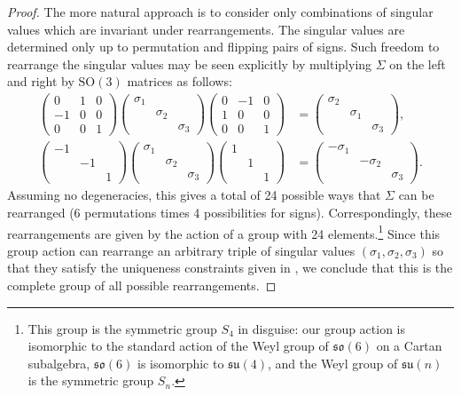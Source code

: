 \begin{proof}
The more natural approach is to consider only combinations of singular values which are invariant under rearrangements. The singular values are determined only up to permutation and flipping pairs of signs. Such freedom to rearrange the singular values may be seen explicitly by multiplying $\Sigma$ on the left and right by $\mathrm{SO}(3)$ matrices as follows:
\begin{align}
\left(\begin{array}{ccc}
0 & 1 & 0\\
-1 & 0 & 0\\
0 & 0 & 1
\end{array}\right)\left(\begin{array}{ccc}
\sigma_{1}\\
 & \sigma_{2}\\
 &  & \sigma_{3}
\end{array}\right)\left(\begin{array}{ccc}
0 & -1 & 0\\
1 & 0 & 0\\
0 & 0 & 1
\end{array}\right) & =\left(\begin{array}{ccc}
\sigma_{2}\\
 & \sigma_{1}\\
 &  & \sigma_{3}
\end{array}\right),\nonumber \\
\left(\begin{array}{ccc}
-1\\
 & -1\\
 &  & 1
\end{array}\right)\left(\begin{array}{ccc}
\sigma_{1}\\
 & \sigma_{2}\\
 &  & \sigma_{3}
\end{array}\right)\left(\begin{array}{ccc}
1\\
 & 1\\
 &  & 1
\end{array}\right) & =\left(\begin{array}{ccc}
-\sigma_{1}\\
 & -\sigma_{2}\\
 &  & \sigma_{3}
\end{array}\right).\label{eq:SVD-signs}
\end{align}
Assuming no degeneracies, this gives a total of 24 possible ways that $\Sigma$ can be rearranged (6 permutations times 4 possibilities for signs). Correspondingly, these rearrangements are given by the action of a group with 24 elements.\footnote{This group is the symmetric group $S_{4}$ in disguise: our group action is isomorphic to the standard action of the Weyl group of $\mathfrak{so}(6)$ on a Cartan subalgebra, $\mathfrak{so}(6)$ is isomorphic to $\mathfrak{su}(4)$, and the Weyl group of $\mathfrak{su}(n)$ is the symmetric group $S_{n}$.} Since this group action can rearrange an arbitrary triple of singular values $(\sigma_{1},\sigma_{2},\sigma_{3})$ so that they satisfy the uniqueness constraints given in , we conclude that this is the complete group of all possible rearrangements.


\end{proof}
